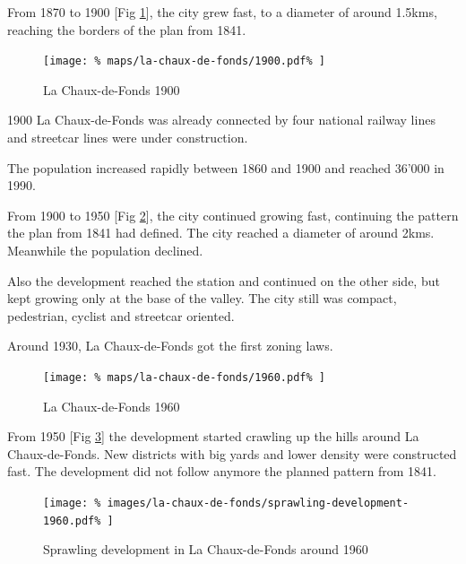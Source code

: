 \documentclass{article}
\begin{document}
\begin{multicols}{2}
			From 1870 to 1900 [Fig \ref{fig:map:la-chaux-de-fonds-1900}], the city grew fast, to a diameter of around 1.5kms, reaching the borders of the plan from 1841.
			
			\begin{figure}[H]
				\texttt{[image: \%
					maps/la-chaux-de-fonds/1900.pdf\%
				]}
				\caption{La Chaux-de-Fonds 1900  \cite{MapGeoAdmin:LaChauxDeFonds}}
				\label{fig:map:la-chaux-de-fonds-1900}
			\end{figure}
			
			1900 La Chaux-de-Fonds was already connected by four national railway lines and streetcar lines were under construction.
			
			
			The population increased rapidly between 1860 and 1900 and reached 36'000 in 1990.

			

			From 1900 to 1950 [Fig \ref{fig:map:la-chaux-de-fonds-1960}], the city continued growing fast, continuing the pattern the plan from 1841 had defined. The city reached a diameter of around 2kms. Meanwhile the population declined.
			
			Also the development reached the station and continued on the other side, but kept growing only at the base of the valley.
			The city still was compact, pedestrian, cyclist and streetcar oriented.
			
			Around 1930, La Chaux-de-Fonds got the first zoning laws.
			
			\begin{figure}[H]
				\texttt{[image: \%
					maps/la-chaux-de-fonds/1960.pdf\%
				]}
				\caption{La Chaux-de-Fonds 1960  \cite{MapGeoAdmin:LaChauxDeFonds}}
				\label{fig:map:la-chaux-de-fonds-1960}
			\end{figure}
			
			
			From 1950 [Fig \ref{fig:map:la-chaux-de-fonds-sprawling-development-1960}] the development started crawling up the hills around La Chaux-de-Fonds.
			New districts with big yards and lower density were constructed fast.
			The development did not follow anymore the planned pattern from 1841.
			
			\begin{figure}[H]
				\texttt{[image: \%
					images/la-chaux-de-fonds/sprawling-development-1960.pdf\%
				]}
				\caption{Sprawling development in La Chaux-de-Fonds around 1960 \cite{MapGeoAdmin:LaChauxDeFonds}}
				\label{fig:map:la-chaux-de-fonds-sprawling-development-1960}
			\end{figure}
			

\end{multicols}
\end{document}
